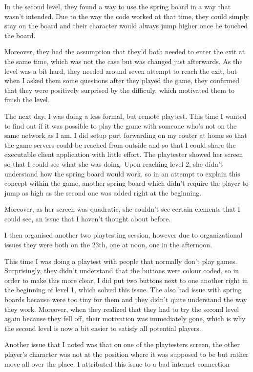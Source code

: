 \documentclass{article}
\begin{document}
In the second level, they found a way to use the spring board in a way that wasn't intended. Due to the way the code worked at that time, they could simply stay on the board and their character would always jump higher once he touched the board.

Moreover, they had the assumption that they'd both needed to enter the exit at the same time, which was not the case but was changed just afterwards. As the level was a bit hard, they needed around seven attempt to reach the exit, but when I asked them some questions after they played the game, they confirmed that they were positively surprised by the difficuly, which motivated them to finish the level.

\bigskip
The next day, I was doing a less formal, but remote playtest. This time I wanted to find out if it was possible to play the game with someone who's not on the same network as I am. I did setup port forwarding on my router at home so that the game servers could be reached from outside and so that I could share the executable client application with little effort. The playtester showed her screen so that I could see what she was doing. 
Upon reaching level 2, she didn't understand how the spring board would work, so in an attempt to explain this concept within the game, another spring board which didn't require the player to jump as high as the second one was added right at the beginning.

Moreover, as her screen was quadratic, she couldn't see certain elements that I could see, an issue that I haven't thought about before.

\bigskip
I then organised another two playtesting session, however due to organizational issues they were both on the 23th, one at noon, one in the afternoon.

\bigskip
This time I was doing a playtest with people that normally don't play games. 
Surprisingly, they didn't understand that the buttons were colour coded, so in order to make this more clear, I did put two buttons next to one another right in the beginning of level 1, which solved this issue.
The also had issue with spring boards because were too tiny for them and they didn't quite understand the way they work. 
Moreover, when they realized that they had to try the second level again because they fell off, their motivation was immediately gone, which is why the second level is now a bit easier to satisfy all potential players.

Another issue that I noted was that on one of the playtesters screen, the other player's character was not at the position where it was supposed to be but rather move all over the place. I attributed this issue to a bad internet connection
\end{document}
